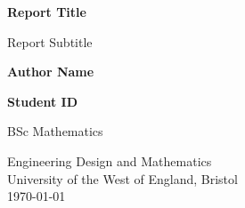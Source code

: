 \begin{titlepage}
    \begin{center}
        \vspace*{1cm}
        
        \Huge
        \textbf{Report Title}
        
        \vspace{0.5cm}
        \LARGE
        Report Subtitle %
        
        \vspace{1.5cm}
        
        \textbf{Author Name}
   		  \vspace{1.5cm}
        
        \textbf{Student ID}
       
        \vfill
        
        BSc Mathematics
        
        \vspace{0.8cm}
          \Large
        Engineering Design and Mathematics\\
        University of the West of England, Bristol\\
       \today
        
    \end{center}
\end{titlepage}